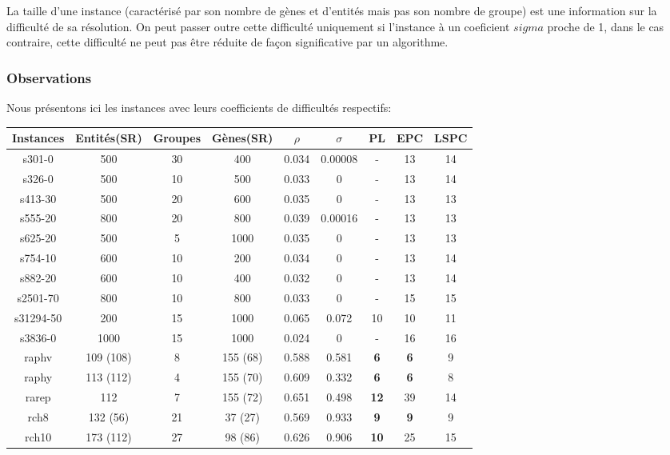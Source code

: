 \begin{proposition}
La taille d'une instance (caractérisé par son nombre de gènes et d'entités mais pas son nombre de groupe) est une information sur la difficulté de sa résolution. On peut passer outre cette difficulté uniquement si l'instance à un coeficient $sigma$ proche de 1, dans le cas contraire, cette difficulté ne peut pas être réduite de façon significative par un algorithme.
\end{proposition}


\subsubsection{Observations}

Nous présentons ici les instances avec leurs coefficients de difficultés respectifs:
\begin{center}
\begin{tabular}{|c|c|c|c|c|c|c|c|c|}
\hline 
Instances & Entités(SR) & Groupes & Gènes(SR)& $\rho$ & $\sigma$ & PL & EPC & LSPC \\ 
\hline 
s301-0 & 500 & 30 & 400 & 0.034 & 0.00008 & - & 13 & 14 \\ 
\hline 
s326-0 & 500 & 10 & 500 & 0.033 & 0 & - & 13 & 14 \\ 
\hline 
s413-30 & 500 & 20 & 600 & 0.035 & 0 & - & 13 & 13 \\ 
\hline 
s555-20 & 800 & 20 & 800 & 0.039 & 0.00016 & - & 13 & 13 \\ 
\hline 
s625-20 & 500 & 5 & 1000 & 0.035 & 0 & - & 13 & 13 \\ 
\hline 
s754-10 & 600 & 10 & 200 & 0.034 & 0 & - & 13 & 14 \\ 
\hline 
s882-20 & 600 & 10 & 400 & 0.032 & 0 & - & 13 & 14 \\ 
\hline 
s2501-70 & 800 & 10 & 800 & 0.033 & 0 & - & 15 & 15 \\ 
\hline 
s31294-50 & 200 & 15 & 1000 & 0.065 & 0.072 & 10 & 10 & 11 \\ 
\hline 
s3836-0 & 1000 & 15 & 1000 & 0.024 & 0 & - & 16 & 16 \\ 
\hline 
raphv & 109 (108) & 8 & 155 (68) & 0.588 & 0.581 & \textbf{6} & \textbf{6} & 9 \\ 
\hline 
raphy & 113 (112) & 4 & 155 (70) & 0.609 & 0.332 & \textbf{6} & \textbf{6} & 8 \\ 
\hline 
rarep & 112 & 7 & 155 (72) & 0.651 & 0.498 & \textbf{12} & 39 & 14 \\ 
\hline 
rch8 & 132 (56) & 21 & 37 (27) & 0.569 & 0.933 & \textbf{9} & \textbf{9} & 9 \\ 
\hline 
rch10 & 173 (112) & 27 & 98 (86) & 0.626 & 0.906 & \textbf{10} & 25 & 15 \\ 
\hline 
\end{tabular} 
\end{center}

